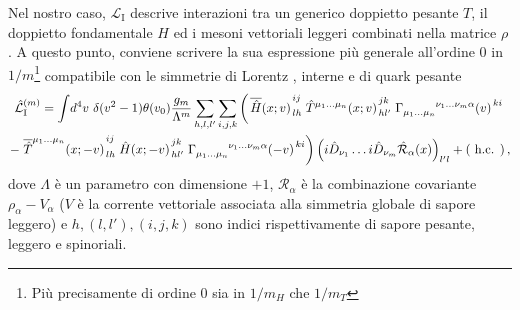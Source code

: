 \documentclass{article}
\newcommand{\adj}[1]{\overline{#1}}
\begin{document}
Nel nostro caso, $\mathcal{L}_\text{I}$ descrive interazioni tra un generico doppietto pesante $T$, il doppietto fondamentale $H$ ed i mesoni vettoriali leggeri combinati nella matrice $\rho$. A questo punto, conviene scrivere la sua espressione più generale all'ordine $0$ in $1/m$\footnote{Più precisamente di ordine $0$ sia in $1/m_H$ che $1/m_T$} compatibile con le simmetrie di Lorentz\footnotemark{} \cite{article:Georgi}, interne e di quark pesante
\begin{multline}
  \hat{\mathcal{L}}^{(m)}_\text{I} = \int \! \mathop{d^4 v} \, \delta(v^2 -1) \theta(v_0) \frac{g_m}{\Lambda^m} \sum_{h,l,l'} \sum_{i,j,k} \left( \left. \adj{\hat{H}}(x; v) \right.^{i j}_{l h}  \left. \hat{T}^{\mu_1 \dots \mu_n}(x; v) \right.^{j k}_{h l'} \left. \Gamma\indices{_{\mu_1 \dots \mu_n}^{\nu_1 \dots \nu_m \alpha}}(v) \right.^{k i} \right. \\ \left. - \left. \adj{\hat{T}}^{\mu_1 \dots \mu_n}(x; -v) \right.^{i j}_{l h} \left. \hat{H}(x; -v) \right.^{j k}_{h l'} \left. \Gamma\indices{_{\mu_1 \dots \mu_n}^{\nu_1 \dots \nu_m \alpha}}(-v) \right.^{k i} \right) \left( i \hat{D}_{\nu_1} \dots i \hat{D}_{\nu_m} \hat{\mathcal{R}}_\alpha(x) \right)_{l' l} + (\text{ h.c. }) \, ,
  \label{eq:most_general_int_lagrangian}
\end{multline}
dove $\Lambda$ è un parametro con dimensione $+1$, $\mathcal{R}_\alpha$ è la combinazione covariante $\rho_\alpha - V_\alpha$ ($V$ è la corrente vettoriale associata alla simmetria globale di sapore leggero) e $h, (l,l'), (i,j,k)$ sono indici rispettivamente di sapore pesante, leggero e spinoriali. 
\end{document}
